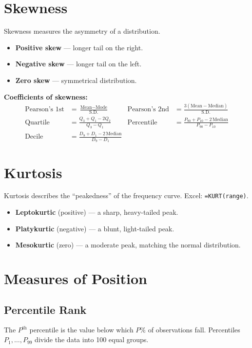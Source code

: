 \documentclass[11pt]{article}
\begin{document}
	\section{Skewness}
	
	Skewness measures the asymmetry of a distribution.
	\begin{itemize}[leftmargin=*]
		\item \textbf{Positive skew} --- longer tail on the right.
		\item \textbf{Negative skew} --- longer tail on the left.
		\item \textbf{Zero skew} --- symmetrical distribution.
	\end{itemize}
	
	\begin{formulabox}
		\textbf{Coefficients of skewness:}
		\begin{align*}
			\text{Pearson's 1st} &= \frac{\text{Mean} - \text{Mode}}{\text{S.D.}}
			& \text{Pearson's 2nd} &= \frac{3(\text{Mean} - \text{Median})}{\text{S.D.}} \\[4pt]
			\text{Quartile} &= \frac{Q_3+Q_1-2Q_2}{Q_3-Q_1}
			& \text{Percentile} &= \frac{P_{90}+P_{10}-2\,\text{Median}}{P_{90}-P_{10}} \\[4pt]
			\text{Decile} &= \frac{D_9+D_1-2\,\text{Median}}{D_9-D_1} & &
		\end{align*}
	\end{formulabox}
	
	\section{Kurtosis}
	
	Kurtosis describes the ``peakedness'' of the frequency curve. Excel: \texttt{=KURT(range)}.
	\begin{itemize}[leftmargin=*]
		\item \textbf{Leptokurtic} (positive) --- a sharp, heavy-tailed peak.
		\item \textbf{Platykurtic} (negative) --- a blunt, light-tailed peak.
		\item \textbf{Mesokurtic} (zero) --- a moderate peak, matching the normal distribution.
	\end{itemize}
	
	\section{Measures of Position}
	
	\subsection{Percentile Rank}
	The $P^{\text{th}}$ percentile is the value below which $P\%$ of observations fall. Percentiles $P_1, \dots, P_{99}$ divide the data into 100 equal groups.
	
\end{document}
